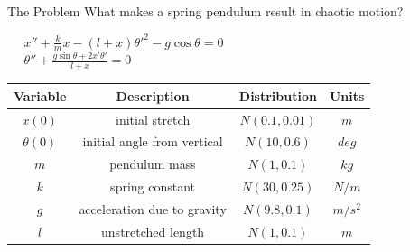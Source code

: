 \documentclass{beamer}
\begin{document}
\begin{frame}{The Problem}
\center
What makes a spring pendulum result in chaotic motion? \newline

$\ \ \ \ \ \ x'' + \frac{k}{m}x - (l+x)\theta'^2 - g \cos\theta = 0$ \\ 
\vspace{12 pt}
$\ \ \ \ \ \ \theta'' + \frac{g \sin\theta + 2x'\theta'}{l+x} = 0$ \\
\vspace{15 pt}
    \begin{tabular}{| c | c | c | c |}
    \hline
    Variable & Description & Distribution & Units \\ \hline
    $x(0)$ & initial stretch & $N(0.1, 0.01)$ & $m$ \\ 
    $\theta(0)$ & initial angle from vertical & $N(10, 0.6)$ & $deg$ \\ 
    $m$ & pendulum mass & $N(1, 0.1)$ & $kg$ \\ 
    $k$ & spring constant & $N(30, 0.25)$ & $N/m$\\ 
    $g$ & acceleration due to gravity & $N(9.8, 0.1)$ & $m/s^2$ \\ 
    $l$ & unstretched length & $N(1, 0.1)$ & $m$\\ \hline
\end{tabular}
\end{frame}

\end{document}
